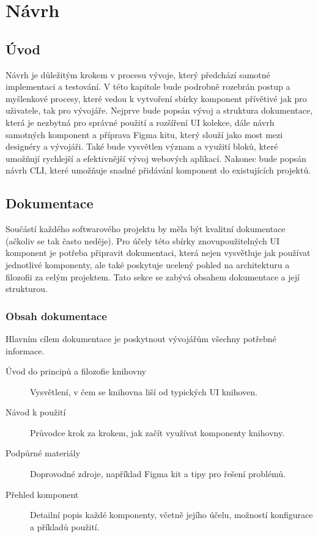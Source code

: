 
\chapter{Návrh}

\section{Úvod}
Návrh je důležitým krokem v procesu vývoje, který předchází samotné implementaci a testování. V této kapitole bude podrobně rozebrán postup a myšlenkové procesy, které vedou k vytvoření sbírky komponent přívětivé jak pro uživatele, tak pro vývojáře. Nejprve bude popsán vývoj a struktura dokumentace, která je nezbytná pro správné použití a rozšíření UI kolekce, dále návrh samotných komponent a příprava Figma kitu, který slouží jako most mezi designéry a vývojáři. Také bude vysvětlen význam a využití bloků, které umožňují rychlejší a efektivnější vývoj webových aplikací. Nakonec bude popsán návrh CLI, které umožňuje snadné přidávání komponent do existujících projektů.

\clearpage

\section{Dokumentace}
Součástí každého softwarového projektu by měla být kvalitní dokumentace (ačkoliv se tak často neděje). Pro účely této sbírky znovupoužitelných UI komponent je potřeba připravit dokumentaci, která nejen vysvětluje jak používat jednotlivé komponenty, ale také poskytuje ucelený pohled na architekturu a filozofii za celým projektem. Tato sekce se zabývá obsahem dokumentace a její strukturou.

\subsection{Obsah dokumentace}
Hlavním cílem dokumentace je poskytnout vývojářům všechny potřebné informace.

\begin{description}
  \item[Úvod do principů a filozofie knihovny] Vysvětlení, v čem se knihovna liší od typických UI knihoven.
  \item[Návod k použití] Průvodce krok za krokem, jak začít využívat komponenty knihovny.
  \item[Podpůrné materiály] Doprovodné zdroje, například Figma kit a tipy pro řešení problémů.
  \item[Přehled komponent] Detailní popis každé komponenty, včetně jejího účelu, možností konfigurace a příkladů použití.
\end{description}

